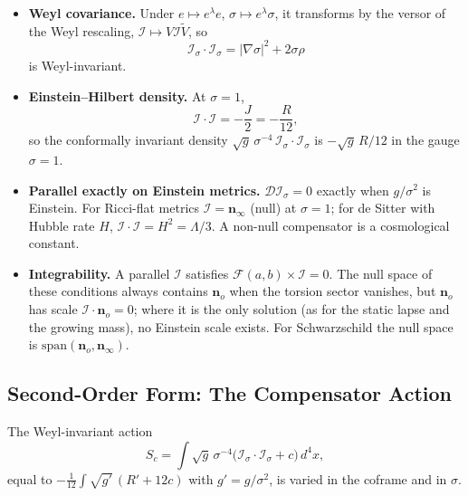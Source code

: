 \documentclass[11pt,a4paper]{article}
\newcommand{\D}{\mathcal{D}}
\newcommand{\F}{\mathcal{F}}
\newcommand{\nzero}{\mathbf{n}_o}
\newcommand{\ninf}{\mathbf{n}_\infty}
\newcommand{\cross}{\mathbin{\times}}
\newcommand{\rev}[1]{\widetilde{#1}}
\begin{document}
\begin{itemize}
    \item \textbf{Weyl covariance.} Under \(e\mapsto e^\lambda e\),
    \(\sigma\mapsto e^\lambda\sigma\), it transforms by the versor of
    the Weyl rescaling,
    \(\mathcal I\mapsto V\mathcal I\rev V\), so
    \[
        \mathcal I_\sigma\cdot\mathcal I_\sigma
        =|\nabla\sigma|^2+2\sigma\rho
    \]
    is Weyl-invariant.

    \item \textbf{Einstein--Hilbert density.} At \(\sigma=1\),
    \[
        \mathcal I\cdot\mathcal I=-\frac J2=-\frac{R}{12},
    \]
    so the conformally invariant density
    \(\sqrt g\,\sigma^{-4}\,\mathcal I_\sigma\cdot\mathcal I_\sigma\)
    is \(-\sqrt g\,R/12\) in the gauge \(\sigma=1\).

    \item \textbf{Parallel exactly on Einstein metrics.}
    \(\D\mathcal I_\sigma=0\) exactly when \(g/\sigma^2\) is Einstein.
    For Ricci-flat metrics \(\mathcal I=\ninf\) (null) at \(\sigma=1\);
    for de Sitter with Hubble rate \(H\),
    \(\mathcal I\cdot\mathcal I=H^2=\Lambda/3\). A non-null
    compensator is a cosmological constant.

    \item \textbf{Integrability.} A parallel \(\mathcal I\) satisfies
    \(\F(a,b)\cross\mathcal I=0\). The null space of these conditions
    always contains \(\nzero\) when the torsion sector vanishes, but
    \(\nzero\) has scale \(\mathcal I\cdot\nzero=0\); where it is the
    only solution (as for the static lapse and the growing mass), no
    Einstein scale exists. For Schwarzschild the null space is
    \(\mathrm{span}(\nzero,\ninf)\).
\end{itemize}

\subsection{Second-Order Form: The Compensator Action}

The Weyl-invariant action
\[
    \boxed{
        S_c=\int\sqrt{g}\,\sigma^{-4}
        \bigl(\mathcal I_\sigma\cdot\mathcal I_\sigma+c\bigr)\,d^4x,
    }
\]
equal to \(-\tfrac1{12}\int\sqrt{g'}\,(R'+12c)\) with
\(g'=g/\sigma^2\), is varied in the coframe and in \(\sigma\).
\end{document}
